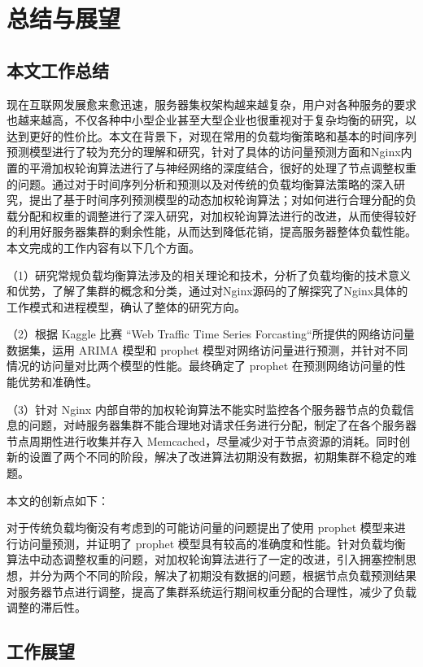 \chapter{总结与展望}

\section{本文工作总结}
现在互联网发展愈来愈迅速，服务器集权架构越来越复杂，用户对各种服务的要求也越来越高，不仅各种中小型企业甚至大型企业也很重视对于复杂均衡的研究，以达到更好的性价比。本文在背景下，对现在常用的负载均衡策略和基本的时间序列预测模型进行了较为充分的理解和研究，针对了具体的访问量预测方面和Nginx内置的平滑加权轮询算法进行了与神经网络的深度结合，很好的处理了节点调整权重的问题。通过对于时间序列分析和预测以及对传统的负载均衡算法策略的深入研究，提出了基于时间序列预测模型的动态加权轮询算法；对如何进行合理分配的负载分配和权重的调整进行了深入研究，对加权轮询算法进行的改进，从而使得较好的利用好服务器集群的剩余性能，从而达到降低花销，提高服务器整体负载性能。本文完成的工作内容有以下几个方面。

（1）研究常规负载均衡算法涉及的相关理论和技术，分析了负载均衡的技术意义和优势，了解了集群的概念和分类，通过对Nginx源码的了解探究了Nginx具体的工作模式和进程模型，确认了整体的研究方向。

（2）根据 Kaggle 比赛 “Web Traffic Time Series Forcasting“所提供的网络访问量数据集，运用 ARIMA 模型和 prophet 模型对网络访问量进行预测，并针对不同情况的访问量对比两个模型的性能。最终确定了 prophet 在预测网络访问量的性能优势和准确性。

（3）针对 Nginx 内部自带的加权轮询算法不能实时监控各个服务器节点的负载信息的问题，对峙服务器集群不能合理地对请求任务进行分配，制定了在各个服务器节点周期性进行收集并存入 Memcached，尽量减少对于节点资源的消耗。同时创新的设置了两个不同的阶段，解决了改进算法初期没有数据，初期集群不稳定的难题。

本文的创新点如下：

对于传统负载均衡没有考虑到的可能访问量的问题提出了使用 prophet 模型来进行访问量预测，并证明了 prophet 模型具有较高的准确度和性能。针对负载均衡算法中动态调整权重的问题，对加权轮询算法进行了一定的改进，引入拥塞控制思想，并分为两个不同的阶段，解决了初期没有数据的问题，根据节点负载预测结果对服务器节点进行调整，提高了集群系统运行期间权重分配的合理性，减少了负载调整的滞后性。

\section{工作展望}

